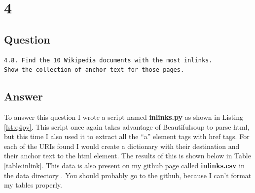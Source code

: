 \documentclass[letterpaper,11pt]{article}
\begin{document}
\clearpage


\section*{4}

\subsection*{Question}

\begin{verbatim}
4.8. Find the 10 Wikipedia documents with the most inlinks. 
Show the collection of anchor text for those pages.
\end{verbatim}

\subsection*{Answer}

To answer this question I wrote a script named \textbf{inlinks.py} as shown in Listing \ref{lst:q4py}.
This script once again takes advantage of Beautifulsoup to parse html, but this time I also used it to extract all the ``a'' element tags with href tags.
For each of the URIs found I would create a dictionary with their destination and their anchor text to the html element.
The results of this is shown below in Table \ref{table:inlink}.
This data is also present on my github page called \textbf{inlinks.csv} in the data directory \cite{github}.
You should probably go to the github, because I can't format my tables properly.

\clearpage
\end{document}
